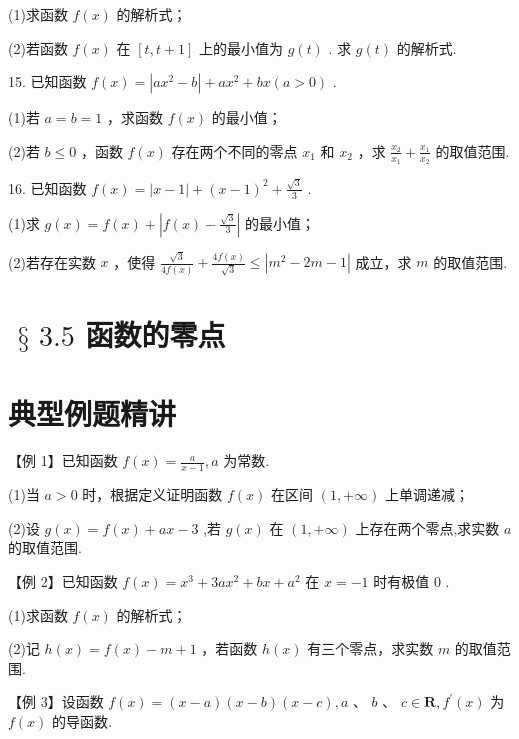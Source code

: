 (1)求函数 $f\left( x\right)$ 的解析式；

(2)若函数 $f\left( x\right)$ 在 $\left\lbrack  {t,t + 1}\right\rbrack$ 上的最小值为 $g\left( t\right)$ . 求 $g\left( t\right)$ 的解析式.

15. 已知函数 $f\left( x\right)  = \left| {a{x}^{2} - b}\right|  + a{x}^{2} + {bx}\left( {a > 0}\right)$ .

(1)若 $a = b = 1$ ，求函数 $f\left( x\right)$ 的最小值；

(2)若 $b \leq  0$ ，函数 $f\left( x\right)$ 存在两个不同的零点 ${x}_{1}$ 和 ${x}_{2}$ ，求 $\frac{{x}_{2}}{{x}_{1}} + \frac{{x}_{1}}{{x}_{2}}$ 的取值范围.

16. 已知函数 $f\left( x\right)  = \left| {x - 1}\right|  + {\left( x - 1\right) }^{2} + \frac{\sqrt{3}}{3}$ .

(1)求 $g\left( x\right)  = f\left( x\right)  + \left| {f\left( x\right)  - \frac{\sqrt{3}}{3}}\right|$ 的最小值；

(2)若存在实数 $x$ ，使得 $\frac{\sqrt{3}}{{4f}\left( x\right) } + \frac{{4f}\left( x\right) }{\sqrt{3}} \leq  \left| {{m}^{2} - {2m} - 1}\right|$ 成立，求 $m$ 的取值范围.

\section*{$\text{ § }{3.5}$ 函数的零点}

\section*{典型例题精讲}

【例 1】已知函数 $f\left( x\right)  = \frac{a}{x - 1},a$ 为常数.

(1)当 $a > 0$ 时，根据定义证明函数 $f\left( x\right)$ 在区间 $\left( {1, + \infty }\right)$ 上单调递减；

(2)设 $g\left( x\right)  = f\left( x\right)  + {ax} - 3$ ,若 $g\left( x\right)$ 在 $\left( {1, + \infty }\right)$ 上存在两个零点,求实数 $a$ 的取值范围.

【例 2】已知函数 $f\left( x\right)  = {x}^{3} + {3a}{x}^{2} + {bx} + {a}^{2}$ 在 $x =  - 1$ 时有极值 0 .

(1)求函数 $f\left( x\right)$ 的解析式；

(2)记 $h\left( x\right)  = f\left( x\right)  - m + 1$ ，若函数 $h\left( x\right)$ 有三个零点，求实数 $m$ 的取值范围.

【例 3】设函数 $f\left( x\right)  = \left( {x - a}\right) \left( {x - b}\right) \left( {x - c}\right) ,a\text{ 、 }b\text{ 、 }c \in  \mathbf{R},{f}^{\prime }\left( x\right)$ 为 $f\left( x\right)$ 的导函数.

